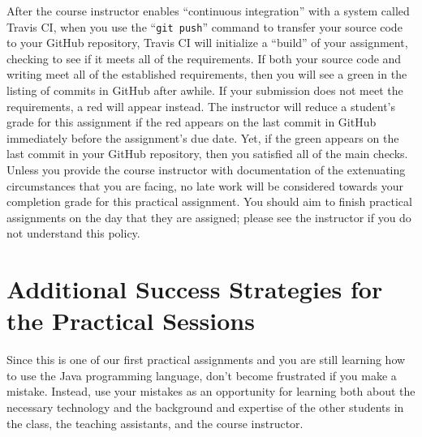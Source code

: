 \documentclass[11pt]{article}
\newcommand{\gitpush}{\command{git push}}
\newcommand{\command}[1]{``\lstinline{#1}''}
\newcommand{\step}[1]{``{#1}''}
\newcommand{\checkmark}{\ding{51}}
\newcommand{\naughtmark}{\ding{55}}
\begin{document}
After the course instructor enables \step{continuous integration} with a system
called Travis CI, when you use the \gitpush{} command to transfer your source
code to your GitHub repository, Travis CI will initialize a \step{build} of your
assignment, checking to see if it meets all of the requirements. If both your
source code and writing meet all of the established requirements, then you will
see a green \checkmark{} in the listing of commits in GitHub after awhile. If
your submission does not meet the requirements, a red \naughtmark{} will appear
instead. The instructor will reduce a student's grade for this assignment if the
red \naughtmark{} appears on the last commit in GitHub immediately before the
assignment's due date. Yet, if the green \checkmark{} appears on the last commit
in your GitHub repository, then you satisfied all of the main checks. Unless you
provide the course instructor with documentation of the extenuating
circumstances that you are facing, no late work will be considered towards your
completion grade for this practical assignment. You should aim to finish
practical assignments on the day that they are assigned; please see the
instructor if you do not understand this policy.

\section*{Additional Success Strategies for the Practical Sessions}

Since this is one of our first practical assignments and you are still learning
how to use the Java programming language, don't become frustrated if you make a
mistake. Instead, use your mistakes as an opportunity for learning both about
the necessary technology and the background and expertise of the other students
in the class, the teaching assistants, and the course instructor.
\end{document}

